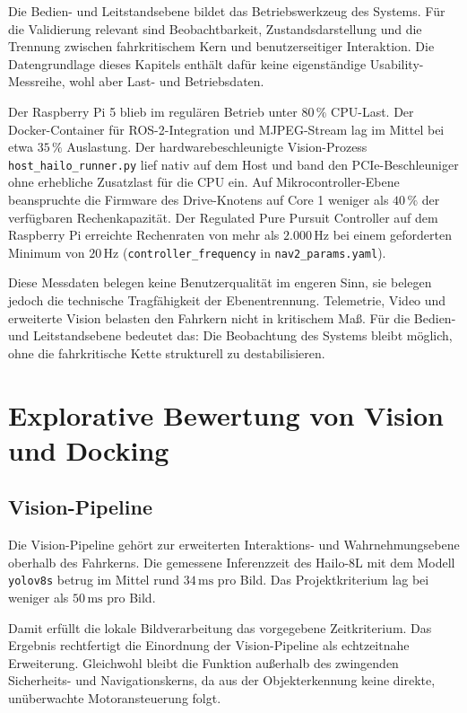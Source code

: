 Die Bedien- und Leitstandsebene bildet das Betriebswerkzeug des Systems. Für die Validierung relevant sind Beobachtbarkeit, Zustandsdarstellung und die Trennung zwischen fahrkritischem Kern und benutzerseitiger Interaktion. Die Datengrundlage dieses Kapitels enthält dafür keine eigenständige Usability-Messreihe, wohl aber Last- und Betriebsdaten.

Der Raspberry Pi 5 blieb im regulären Betrieb unter $80\,\%$ CPU-Last. Der Docker-Container für ROS-2-Integration und MJPEG-Stream lag im Mittel bei etwa $35\,\%$ Auslastung. Der hardwarebeschleunigte Vision-Prozess \texttt{host\_hailo\_runner.py} lief nativ auf dem Host und band den PCIe-Beschleuniger ohne erhebliche Zusatzlast für die CPU ein. Auf Mikrocontroller-Ebene beanspruchte die Firmware des Drive-Knotens auf Core 1 weniger als $40\,\%$ der verfügbaren Rechenkapazität. Der Regulated Pure Pursuit Controller auf dem Raspberry Pi erreichte Rechenraten von mehr als $2{.}000\,\mathrm{Hz}$ bei einem geforderten Minimum von $20\,\mathrm{Hz}$ (\texttt{controller\_frequency} in \texttt{nav2\_params.yaml}).

Diese Messdaten belegen keine Benutzerqualität im engeren Sinn, sie belegen jedoch die technische Tragfähigkeit der Ebenentrennung. Telemetrie, Video und erweiterte Vision belasten den Fahrkern nicht in kritischem Maß. Für die Bedien- und Leitstandsebene bedeutet das: Die Beobachtung des Systems bleibt möglich, ohne die fahrkritische Kette strukturell zu destabilisieren.

\section{Explorative Bewertung von Vision und Docking}

\subsection{Vision-Pipeline}

Die Vision-Pipeline gehört zur erweiterten Interaktions- und Wahrnehmungsebene oberhalb des Fahrkerns. Die gemessene Inferenzzeit des Hailo-8L mit dem Modell \texttt{yolov8s} betrug im Mittel rund $34\,\mathrm{ms}$ pro Bild. Das Projektkriterium lag bei weniger als $50\,\mathrm{ms}$ pro Bild.

Damit erfüllt die lokale Bildverarbeitung das vorgegebene Zeitkriterium. Das Ergebnis rechtfertigt die Einordnung der Vision-Pipeline als echtzeitnahe Erweiterung. Gleichwohl bleibt die Funktion außerhalb des zwingenden Sicherheits- und Navigationskerns, da aus der Objekterkennung keine direkte, unüberwachte Motoransteuerung folgt.

